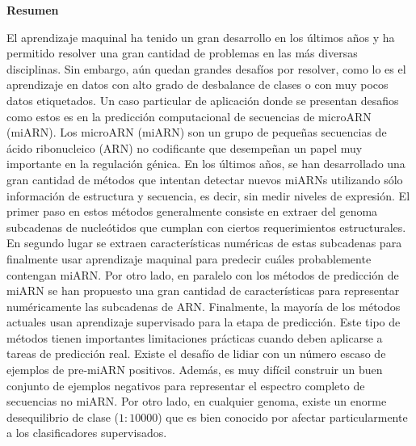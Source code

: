 \newpage
\thispagestyle{empty}

\vspace{3cm}
\begin{center}
{\huge \textbf{Resumen}}
\end{center}
\vspace{1cm}

El aprendizaje maquinal ha tenido un gran desarrollo en los últimos años y ha permitido resolver una gran cantidad de problemas en las más diversas disciplinas.
Sin embargo, aún quedan grandes desafíos por resolver, como lo es el aprendizaje en datos con alto grado de desbalance de clases o con muy pocos datos
etiquetados. Un caso particular de aplicación donde se presentan desafios como estos es en la predicción computacional de secuencias de microARN (miARN).  Los
microARN (miARN) son un grupo de pequeñas secuencias de ácido ribonucleico (ARN) no codificante que desempeñan un papel muy importante en la regulación génica.
En los últimos años, se han desarrollado una gran cantidad de métodos que intentan detectar nuevos miARNs utilizando sólo información de estructura y secuencia,
es decir, sin medir niveles de expresión. El primer paso en estos métodos generalmente consiste en extraer del genoma subcadenas de nucleótidos que cumplan con
ciertos requerimientos estructurales. En segundo lugar se extraen características numéricas de estas subcadenas para finalmente usar aprendizaje maquinal para
predecir cuáles probablemente contengan miARN. Por otro lado, en paralelo con los métodos de predicción de miARN se han propuesto una gran cantidad de
características para representar numéricamente las subcadenas de ARN. Finalmente, la mayoría de los métodos actuales usan aprendizaje supervisado para la etapa
de predicción. Este tipo de métodos tienen importantes limitaciones prácticas cuando deben aplicarse a tareas de predicción real.  Existe el desafío de lidiar
con un número escaso de ejemplos de pre-miARN positivos. Además, es muy difícil construir un buen conjunto de ejemplos negativos para representar el espectro
completo de secuencias no miARN. Por otro lado, en cualquier genoma, existe un enorme desequilibrio de clase ($1:10000$) que es bien conocido por afectar
particularmente a los clasificadores supervisados.

